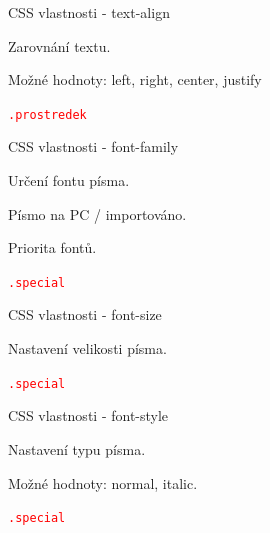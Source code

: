 \documentclass[aspectratio=1610]{beamer}
\begin{document}
\begin{frame}{CSS vlastnosti - text-align}
    \begin{cardTiny}
        Zarovnání textu.

        Možné hodnoty: left, right, center, justify

        \begin{alltt}
            \textcolor{red}{.prostredek} \string{\\
                \textcolor{blue}{text-align}: \textcolor{orange}{center};\\
            \string}
        \end{alltt}
    \end{cardTiny}
\end{frame}

\begin{frame}{CSS vlastnosti - font-family}
    \begin{cardTiny}
        Určení fontu písma.

        Písmo na PC / importováno.

        Priorita fontů.

        \begin{alltt}
            \textcolor{red}{.special} \string{\\
                \textcolor{blue}{font-family}: \textcolor{orange}{"Times New Roman", "Roboto", serif};\\
            \string}
        \end{alltt}
    \end{cardTiny}
\end{frame}

\begin{frame}{CSS vlastnosti - font-size}
    \begin{cardTiny}
        Nastavení velikosti písma.

        \begin{alltt}
            \textcolor{red}{.special} \string{\\
                \textcolor{blue}{font-size}: \textcolor{orange}{40px};\\
            \string}
        \end{alltt}
    \end{cardTiny}
\end{frame}

\begin{frame}{CSS vlastnosti - font-style}
    \begin{cardTiny}
        Nastavení typu písma.

        Možné hodnoty: normal, italic.

        \begin{alltt}
            \textcolor{red}{.special} \string{\\
                \textcolor{blue}{font-style}: \textcolor{orange}{italic};\\
            \string}
        \end{alltt}
    \end{cardTiny}
\end{frame}
\end{document}
